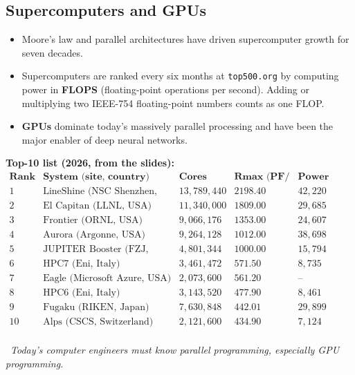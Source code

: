 \documentclass[hidelinks]{article}
\newcommand{\callout}[1]{\par\smallskip\noindent{\color{capri}$\blacktriangleright$}\ \textit{#1}\par\smallskip}
\begin{document}
\subsection{Supercomputers and GPUs}

\begin{itemize}
    \item Moore's law and parallel architectures have driven supercomputer growth for seven decades.
    \item Supercomputers are ranked every six months at \texttt{top500.org} by computing power in \textbf{FLOPS} (floating-point operations per second). Adding or multiplying two IEEE-754 floating-point numbers counts as one FLOP.
    \item \textbf{GPUs} dominate today's massively parallel processing and have been the major enabler of deep neural networks.
\end{itemize}

\textbf{Top-10 list (2026, from the slides):}
\[
\begin{array}{clrrr}
\textbf{Rank} & \textbf{System (site, country)} & \textbf{Cores} & \textbf{Rmax (PF/s)} & \textbf{Power (kW)}\\ \hline
1 & \text{LineShine (NSC Shenzhen, China)} & 13{,}789{,}440 & 2198.40 & 42{,}220\\
2 & \text{El Capitan (LLNL, USA)} & 11{,}340{,}000 & 1809.00 & 29{,}685\\
3 & \text{Frontier (ORNL, USA)} & 9{,}066{,}176 & 1353.00 & 24{,}607\\
4 & \text{Aurora (Argonne, USA)} & 9{,}264{,}128 & 1012.00 & 38{,}698\\
5 & \text{JUPITER Booster (FZJ, Germany)} & 4{,}801{,}344 & 1000.00 & 15{,}794\\
6 & \text{HPC7 (Eni, Italy)} & 3{,}461{,}472 & 571.50 & 8{,}735\\
7 & \text{Eagle (Microsoft Azure, USA)} & 2{,}073{,}600 & 561.20 & \text{--}\\
8 & \text{HPC6 (Eni, Italy)} & 3{,}143{,}520 & 477.90 & 8{,}461\\
9 & \text{Fugaku (RIKEN, Japan)} & 7{,}630{,}848 & 442.01 & 29{,}899\\
10 & \text{Alps (CSCS, Switzerland)} & 2{,}121{,}600 & 434.90 & 7{,}124\\
\end{array}
\]

\callout{Today's computer engineers must know parallel programming, especially GPU programming.}
\end{document}
